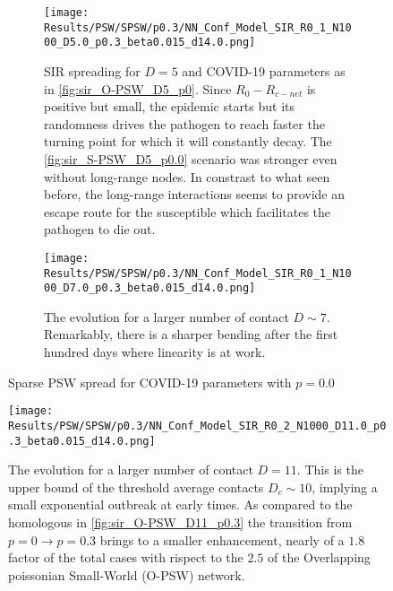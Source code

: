 \documentclass[a4paper,10pt,twoside]{book} %
\theoremstyle{definition}
\begin{document}
\begin{figure}[ht]
	\centering
	\begin{subfigure}{\linewidth}
		\centering
		\texttt{[image: Results/PSW/SPSW/p0.3/NN\_Conf\_Model\_SIR\_R0\_1\_N1000\_D5.0\_p0.3\_beta0.015\_d14.0.png]}
		\caption{SIR spreading for $D = 5$ and COVID-19 parameters as in \autoref{fig:sir_O-PSW_D5_p0}. Since $R_0 - R_{c-net}$ is positive but small, the epidemic starts but its randomness drives the pathogen to reach faster the turning point for which it will constantly decay. The \autoref{fig:sir_S-PSW_D5_p0.0} scenario was stronger even without long-range nodes. In constrast to what seen before, the long-range interactions seems to provide an escape route for the susceptible which facilitates the pathogen to die out.}
		\label{fig:sir_SPSW_COVID_D5_p0.3}
	\end{subfigure}
	\vfill	
	\begin{subfigure}{\linewidth}
		\centering
		\texttt{[image: Results/PSW/SPSW/p0.3/NN\_Conf\_Model\_SIR\_R0\_1\_N1000\_D7.0\_p0.3\_beta0.015\_d14.0.png]}
		\caption{The evolution for a larger number of contact $D \sim 7$. Remarkably, there is a sharper bending after the first hundred days where linearity is at work.}
		\label{fig:sir_SPSW_COVID_D7_p0.3}
	\end{subfigure}
	\caption{Sparse PSW spread for COVID-19 parameters with $p = 0.0$ }
	\label{fig:sir_SPSW_COVID_p0.3}
\end{figure}

\clearpage
\begin{figure}[h]
	\centering
	\texttt{[image: Results/PSW/SPSW/p0.3/NN\_Conf\_Model\_SIR\_R0\_2\_N1000\_D11.0\_p0.3\_beta0.015\_d14.0.png]}
	\caption{The evolution for a larger number of contact $D = 11$. This is the upper bound of the threshold average contacts $ D_c \sim 10$, implying a small exponential outbreak at early times. As compared to the homologous in \autoref{fig:sir_O-PSW_D11_p0.3} the transition from $ p = 0 \rightarrow p = 0.3$ brings to a smaller enhancement, nearly of a $1.8$ factor of the total cases with rispect to the $ 2.5$ of the Overlapping poissonian Small-World (O-PSW) network.}
	\label{fig:sir_SPSW_COVID_D11_p0.3}
\end{figure}

\clearpage
\end{document}
